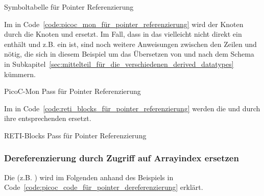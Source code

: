 \begin{code}
  \centering
  \caption{Symboltabelle für Pointer Referenzierung}
  \label{code:symboltabelle_für_pointer_referenzierung}
\end{code}

Im  in Code~\ref{code:picoc_mon_für_pointer_referenzierung} wird der Knoten  durch die Knoten  und  ersetzt. Im Fall, dass in  das  vielleicht nicht direkt ein  enthält und  z.B. ein  ist, sind noch weitere Anweisungen zwischen den Zeilen  und   nötig, die sich in diesem Beispiel um das Übersetzen von  und  nach dem Schema in Subkapitel~\ref{sec:mittelteil_für_die_verschiedenen_derived_datatypes} kümmern.

\begin{code}
  \centering
  \caption{PicoC-Mon Pass für Pointer Referenzierung}
  \label{code:picoc_mon_für_pointer_referenzierung}
\end{code}

Im  in Code~\ref{code:reti_blocks_für_pointer_referenzierung} werden die   und  durch ihre entsprechenden  ersetzt.

\begin{code}
  \centering
  \caption{RETI-Blocks Pass für Pointer Referenzierung}
  \label{code:reti_blocks_für_pointer_referenzierung}
\end{code}
\subsubsection{Dereferenzierung durch Zugriff auf Arrayindex ersetzen}
Die  (z.B. ) wird im Folgenden anhand des Beispiels in Code~\ref{code:picoc_code_für_pointer_dereferenzierung} erklärt.

